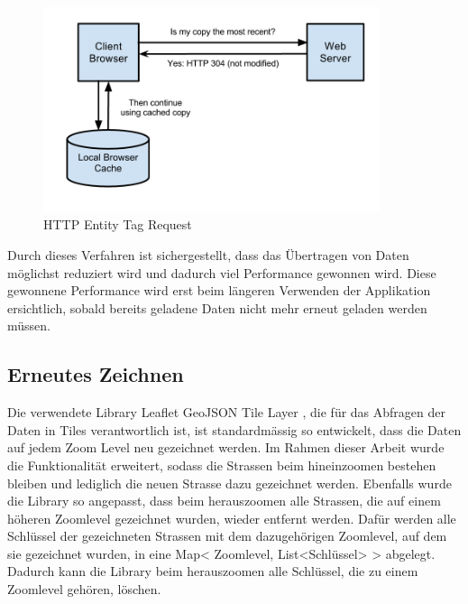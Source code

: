 \begin{figure}[H]
\centering
\includegraphics[height=6cm]{images/browser_etag.jpg}
\caption{HTTP Entity Tag Request \cite{HTTPCacheHeaders}}
\label{pic:browser_etag}
\end{figure}
\noindent
Durch dieses Verfahren ist sichergestellt, dass das Übertragen von Daten möglichst reduziert wird und dadurch viel Performance gewonnen wird. Diese gewonnene Performance wird erst beim längeren Verwenden der Applikation ersichtlich, sobald bereits geladene Daten nicht mehr erneut geladen werden müssen.
\newpage
\subsection{Erneutes Zeichnen}
Die verwendete Library \glqq{}Leaflet GeoJSON Tile Layer\grqq{} \cite{LeafletGeoJSON}, die für das Abfragen der Daten in Tiles verantwortlich ist, ist standardmässig so entwickelt, dass die Daten auf jedem Zoom Level neu gezeichnet werden. Im Rahmen dieser Arbeit wurde die Funktionalität erweitert, sodass die Strassen beim hineinzoomen bestehen bleiben und lediglich die neuen Strasse dazu gezeichnet werden. Ebenfalls wurde die Library so angepasst, dass  beim herauszoomen alle Strassen, die auf einem höheren Zoomlevel gezeichnet wurden, wieder entfernt werden. Dafür werden alle Schlüssel der gezeichneten Strassen mit dem dazugehörigen Zoomlevel, auf dem sie gezeichnet wurden, in eine Map< Zoomlevel, List<Schlüssel> > abgelegt. Dadurch kann die Library beim herauszoomen alle Schlüssel, die zu einem Zoomlevel gehören, löschen.
